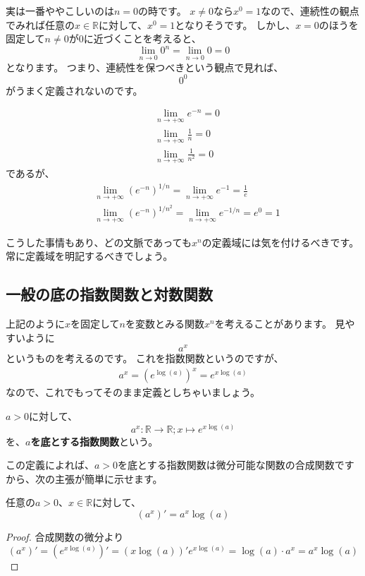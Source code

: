 実は一番ややこしいのは$n=0$の時です。
$x\neq0$なら$x^0=1$なので、連続性の観点でみれば任意の$x\in\mathbb{R}$に対して、$x^0=1$となりそうです。
しかし、$x=0$のほうを固定して$n\neq0$が0に近づくことを考えると、
\[
  \lim_{n\to0}0^n=\lim_{n\to0}0=0
\]
となります。
つまり、連続性を保つべきという観点で見れば、
\[
  0^0
\]
がうまく定義されないのです。
\begin{example}
  \begin{align*}
    &\lim_{n\to+\infty}e^{-n}=0\\
    &\lim_{n\to+\infty}\frac1{n}=0\\
    &\lim_{n\to+\infty}\frac1{n^2}=0
  \end{align*}
  であるが、
  \begin{align*}
    &\lim_{n\to+\infty}(e^{-n})^{1/n}=\lim_{n\to+\infty}e^{-1}=\frac1e\\
    &\lim_{n\to+\infty}(e^{-n})^{1/n^2}=\lim_{n\to+\infty}e^{-1/n}=e^0=1
  \end{align*}
\end{example}
こうした事情もあり、どの文脈であっても$x^n$の定義域には気を付けるべきです。
常に定義域を明記するべきでしょう。

\subsection{一般の底の指数関数と対数関数}

上記のように$x$を固定して$n$を変数とみる関数$x^n$を考えることがあります。
見やすいように
\[
  a^x
\]
というものを考えるのです。
これを指数関数というのですが、
\begin{align*}
  a^x=(e^{\log(a)})^x=e^{x\log(a)}
\end{align*}
なので、これでもってそのまま定義としちゃいましょう。
\begin{definition}
  $a>0$に対して、
  \[
    a^x:\mathbb{R}\to\mathbb{R};x\mapsto e^{x\log(a)}
  \]
  を、\textbf{$a$を底とする指数関数}という。
\end{definition}

この定義によれば、$a>0$を底とする指数関数は微分可能な関数の合成関数ですから、次の主張が簡単に示せます。
\begin{theorem}
  任意の$a>0$、$x\in\mathbb{R}$に対して、
  \[
    (a^x)'=a^x\log(a)
  \]
\end{theorem}
\begin{proof}
  合成関数の微分より
  \[
    (a^x)'=(e^{x\log(a)})'=(x\log(a))'e^{x\log(a)}=\log(a)\cdot a^x=a^x\log(a)
  \]
\end{proof}

